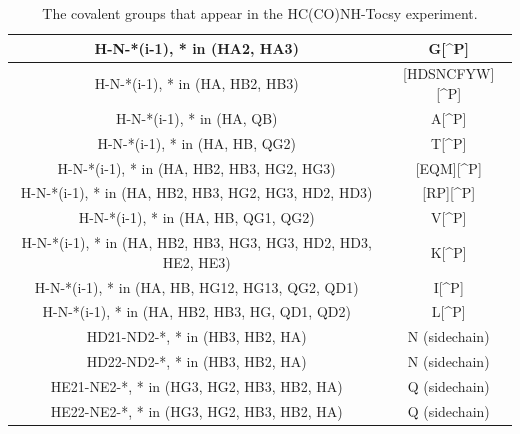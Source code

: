 \begin{table}
  \begin{tabular}{ | c | c | }
    \hline
    H-N-*(i-1), * in (HA2, HA3)                         &  G[\^{}P]             \\  \hline
    H-N-*(i-1), * in (HA, HB2, HB3)                     &  [HDSNCFYW][\^{}P]    \\  \hline
    H-N-*(i-1), * in (HA, QB)                           &  A[\^{}P]             \\  \hline
    H-N-*(i-1), * in (HA, HB, QG2)                      &  T[\^{}P]             \\  \hline
    H-N-*(i-1), * in (HA, HB2, HB3, HG2, HG3)           &  [EQM][\^{}P]         \\  \hline
    H-N-*(i-1), * in (HA, HB2, HB3, HG2, HG3, HD2, HD3) &  [RP][\^{}P]          \\  \hline
    H-N-*(i-1), * in (HA, HB, QG1, QG2)                 &  V[\^{}P]             \\  \hline
    H-N-*(i-1), * in (HA, HB2, HB3, HG3, HG3, HD2, HD3, HE2, HE3)   &  K[\^{}P] \\  \hline
    H-N-*(i-1), * in (HA, HB, HG12, HG13, QG2, QD1)     &  I[\^{}P]             \\  \hline
    H-N-*(i-1), * in (HA, HB2, HB3, HG, QD1, QD2)       &  L[\^{}P]             \\  \hline
    HD21-ND2-*, * in (HB3, HB2, HA)   &  N (sidechain)                  \\  \hline
    HD22-ND2-*, * in (HB3, HB2, HA)   &  N (sidechain)                  \\  \hline
    HE21-NE2-*, * in (HG3, HG2, HB3, HB2, HA)   &  Q (sidechain)        \\  \hline
    HE22-NE2-*, * in (HG3, HG2, HB3, HB2, HA)   &  Q (sidechain)        \\  \hline
  \end{tabular}
  \caption{The covalent groups that appear in the HC(CO)NH-Tocsy experiment.}
  \label{hcconh_peaktypes}
\end{table}


